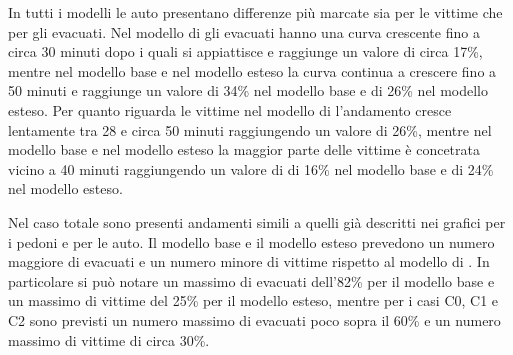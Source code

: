 In tutti i modelli le auto presentano differenze più marcate sia per le vittime che per gli evacuati. 
Nel modello di \textcite{wang2021novel} gli evacuati hanno una curva crescente fino a circa 30 minuti dopo i quali si appiattisce e raggiunge un valore di circa 17\%, 
mentre nel modello base e nel modello esteso la curva continua a crescere fino a 50 minuti e raggiunge un valore di 34\% nel modello base e di 26\% nel modello esteso.
Per quanto riguarda le vittime nel modello di \textcite{wang2021novel} l'andamento cresce lentamente tra 28 e circa 50 minuti raggiungendo un valore di 26\%, mentre nel
modello base e nel modello esteso la maggior parte delle vittime è concetrata vicino a 40 minuti raggiungendo un valore di di 16\% nel modello base e di 24\% nel modello esteso.

Nel caso totale sono presenti andamenti simili a quelli già descritti nei grafici per i pedoni e per le auto. 
Il modello base e il modello esteso prevedono un numero maggiore di evacuati e un numero minore di vittime rispetto al modello di \textcite{wang2021novel}.
In particolare si può notare un massimo di evacuati dell'82\% per il modello base e un massimo di vittime del 25\% per il modello esteso,
mentre per i casi C0, C1 e C2 sono previsti un numero massimo di evacuati poco sopra il 60\% e un numero massimo di vittime di circa 30\%.

\newpage
